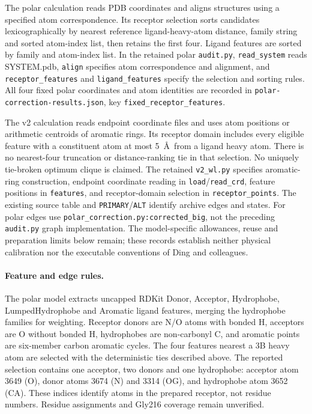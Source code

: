 \documentclass{article}
\begin{document}
The polar calculation reads PDB coordinates and aligns structures using a specified atom correspondence. Its receptor selection sorts candidates lexicographically by nearest reference ligand-heavy-atom distance, family string and sorted atom-index list, then retains the first four. Ligand features are sorted by family and atom-index list. In the retained polar \texttt{audit.py}, \texttt{read\_system} reads SYSTEM.pdb, \texttt{align} specifies atom correspondence and alignment, and \texttt{receptor\_features} and \texttt{ligand\_features} specify the selection and sorting rules. All four fixed polar coordinates and atom identities are recorded in \texttt{polar-correction-results.json}, key \texttt{fixed\_receptor\_features}.

The v2 calculation reads endpoint coordinate files and uses atom positions or arithmetic centroids of aromatic rings. Its receptor domain includes every eligible feature with a constituent atom at most 5~\AA\ from a ligand heavy atom. There is no nearest-four truncation or distance-ranking tie in that selection. No uniquely tie-broken optimum clique is claimed. The retained \texttt{v2\_wl.py} specifies aromatic-ring construction, endpoint coordinate reading in \texttt{load}/\texttt{read\_crd}, feature positions in \texttt{features}, and receptor-domain selection in \texttt{receptor\_points}. The existing source table and \texttt{PRIMARY}/\texttt{ALT} identify archive edges and states. For polar edges use \texttt{polar\_correction.py:corrected\_big}, not the preceding \texttt{audit.py} graph implementation. The model-specific allowances, reuse and preparation limits below remain; these records establish neither physical calibration nor the executable conventions of Ding and colleagues.

\paragraph{Feature and edge rules.}
The polar model extracts uncapped RDKit Donor, Acceptor, Hydrophobe, LumpedHydrophobe and Aromatic ligand features, merging the hydrophobe families for weighting. Receptor donors are N/O atoms with bonded H, acceptors are O without bonded H, hydrophobes are non-carbonyl C, and aromatic points are six-member carbon aromatic cycles. The four features nearest a 3B heavy atom are selected with the deterministic ties described above. The reported selection contains one acceptor, two donors and one hydrophobe: acceptor atom 3649 (O), donor atoms 3674 (N) and 3314 (OG), and hydrophobe atom 3652 (CA). These indices identify atoms in the prepared receptor, not residue numbers. Residue assignments and Gly216 coverage remain unverified.
\end{document}
